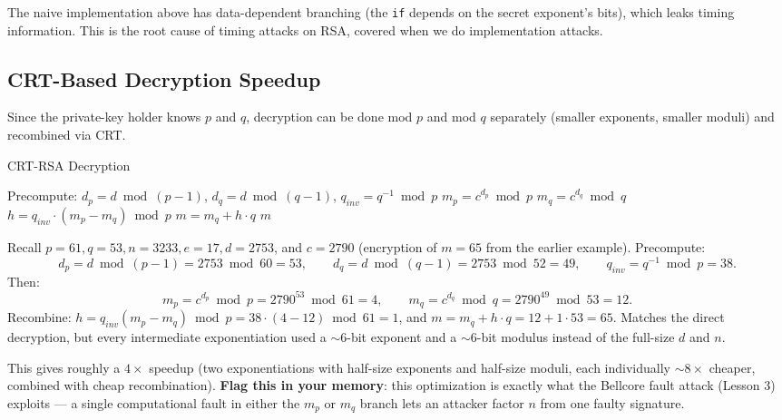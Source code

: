 \begin{remark}
The naive implementation above has data-dependent branching (the \texttt{if} depends on the secret exponent's bits), which leaks timing information. This is the root cause of timing attacks on RSA, covered when we do implementation attacks.
\end{remark}

\subsection{CRT-Based Decryption Speedup}\label{sec:crt-speedup}

Since the private-key holder knows $p$ and $q$, decryption can be done mod $p$ and mod $q$ separately (smaller exponents, smaller moduli) and recombined via CRT.

\begin{algorithm}[h]
\caption{CRT-RSA Decryption}
\begin{algorithmic}[1]
\State Precompute: $d_p = d \bmod (p-1)$, \quad $d_q = d \bmod (q-1)$, \quad $q_{inv} = q^{-1} \bmod p$
\State $m_p = c^{d_p} \bmod p$
\State $m_q = c^{d_q} \bmod q$
\State $h = q_{inv} \cdot (m_p - m_q) \bmod p$
\State $m = m_q + h \cdot q$
\State \Return $m$
\end{algorithmic}
\end{algorithm}

\begin{example}
Recall $p=61, q=53, n=3233, e=17, d=2753$, and $c = 2790$ (encryption of $m=65$ from the earlier example). Precompute:
\[
d_p = d \bmod (p-1) = 2753 \bmod 60 = 53, \qquad d_q = d \bmod (q-1) = 2753 \bmod 52 = 49, \qquad q_{inv} = q^{-1} \bmod p = 38.
\]
Then:
\[
m_p = c^{d_p} \bmod p = 2790^{53} \bmod 61 = 4, \qquad m_q = c^{d_q} \bmod q = 2790^{49} \bmod 53 = 12.
\]
Recombine: $h = q_{inv}(m_p - m_q) \bmod p = 38 \cdot (4-12) \bmod 61 = 1$, and $m = m_q + h \cdot q = 12 + 1 \cdot 53 = 65$. \checkmark Matches the direct decryption, but every intermediate exponentiation used a $\sim$6-bit exponent and a $\sim$6-bit modulus instead of the full-size $d$ and $n$.
\end{example}

This gives roughly a $4\times$ speedup (two exponentiations with half-size exponents and half-size moduli, each individually $\sim 8\times$ cheaper, combined with cheap recombination). \textbf{Flag this in your memory}: this optimization is exactly what the Bellcore fault attack (Lesson 3) exploits — a single computational fault in either the $m_p$ or $m_q$ branch lets an attacker factor $n$ from one faulty signature.

